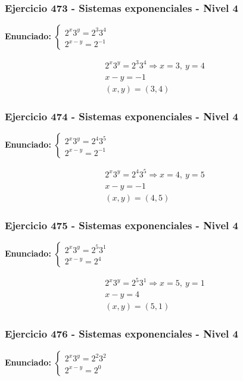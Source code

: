 \documentclass[12pt,a4paper]{article}
\begin{document}
\subsubsection*{Ejercicio 473 - Sistemas exponenciales - Nivel 4}
\textbf{Enunciado:} \(\begin{cases} 2^x3^y=2^{3}3^{4}\\ 2^{x-y}=2^{-1}\end{cases}\)

\[
\begin{aligned}
2^x3^y=2^{3}3^{4}\Rightarrow x=3,\ y=4\\
x-y=-1\\
\boxed{(x,y)=(3,4)}
\end{aligned}
\]


\subsubsection*{Ejercicio 474 - Sistemas exponenciales - Nivel 4}
\textbf{Enunciado:} \(\begin{cases} 2^x3^y=2^{4}3^{5}\\ 2^{x-y}=2^{-1}\end{cases}\)

\[
\begin{aligned}
2^x3^y=2^{4}3^{5}\Rightarrow x=4,\ y=5\\
x-y=-1\\
\boxed{(x,y)=(4,5)}
\end{aligned}
\]


\subsubsection*{Ejercicio 475 - Sistemas exponenciales - Nivel 4}
\textbf{Enunciado:} \(\begin{cases} 2^x3^y=2^{5}3^{1}\\ 2^{x-y}=2^{4}\end{cases}\)

\[
\begin{aligned}
2^x3^y=2^{5}3^{1}\Rightarrow x=5,\ y=1\\
x-y=4\\
\boxed{(x,y)=(5,1)}
\end{aligned}
\]


\subsubsection*{Ejercicio 476 - Sistemas exponenciales - Nivel 4}
\textbf{Enunciado:} \(\begin{cases} 2^x3^y=2^{2}3^{2}\\ 2^{x-y}=2^{0}\end{cases}\)
\end{document}
